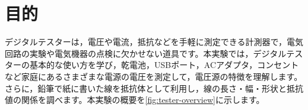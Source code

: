 \graphicspath{{contents/01_tester/figures/}}


\section{目的}

デジタルテスターは，電圧や電流，抵抗などを手軽に測定できる計測器で，電気回路の実験や電気機器の点検に欠かせない道具です。本実験では，デジタルテスターの基本的な使い方を学び，乾電池，USBポート，ACアダプタ，コンセントなど家庭にあるさまざまな電源の電圧を測定して，電圧源の特徴を理解します。さらに，鉛筆で紙に書いた線を抵抗体として利用し，線の長さ・幅・形状と抵抗値の関係を調べます。本実験の概要を\cref{fig:tester-overview}に示します。

